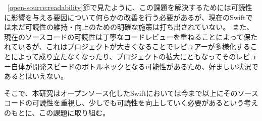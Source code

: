 ~\ref{open-source:readability}節で見たように、この課題を解決するためには可読性に影響を与える要因について何らかの改善を行う必要があるが、現在のSwiftでは未だ可読性の維持・向上のための明確な施策は打ち出されていない。
また、現在のソースコードの可読性は丁寧なコードレビューを重ねることによって保たれているが、これはプロジェクトが大きくなることでレビュアーが多様化することによって成り立たなくなったり、プロジェクトの拡大にともなってそのレビュー自体が開発スピードのボトルネックとなる可能性があるため、好ましい状況であるとはいえない。

そこで、本研究はオープンソース化したSwiftにおいては今まで以上にそのソースコードの可読性を重視し、少しでも可読性を向上していく必要があるという考えのもとに、この課題に取り組む。

